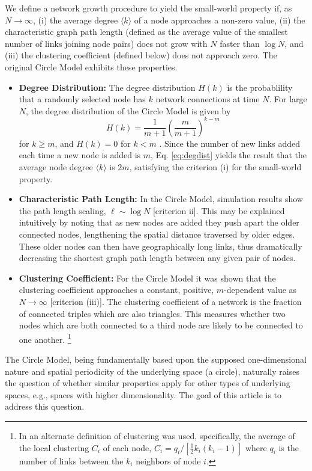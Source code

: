 \documentclass[aps,pre,manuscript,superscriptaddress,amsmath,amssymb,nofootinbib]{revtex4-1}
\begin{document}
We define a network growth procedure to yield the small-world property if, as $N \to \infty$,
(i) the average degree $\langle k \rangle$ of a node approaches a non-zero value,
(ii) the characteristic graph path length (defined as the average value of the smallest number of links joining node pairs) does not grow with $N$ faster than $\log N$, and
(iii) the clustering coefficient (defined below) does not approach zero.
The original Circle Model exhibits these properties.
\begin{itemize}
  \item \textbf{Degree Distribution:} The degree distribution $H(k)$ is the probablility that a randomly selected node has $k$ network connections at time $N$.
For large $N$, the degree distribution of the Circle Model is given by 
\begin{equation}\label{eq:degdist}
H(k) = \frac{1}{m+1}\left(\frac{m}{m+1}\right)^{k-m}
\end{equation}
for $k \geq m$, and $H(k) = 0$ for $k < m$ \cite{ozik2004}.
Since the number of new links added each time a new node is added is $m$, Eq. \eqref{eq:degdist} yields the result that the average node degree $\langle k \rangle$ is $2m$, satisfying the criterion (i) for the small-world property.
  \item \textbf{Characteristic Path Length:} In the Circle Model, simulation results show the path length scaling, $\ell \sim \log N$ [criterion ii].
This may be explained intuitively by noting that as new nodes are added they push apart the older connected nodes, lengthening the spatial distance traversed by older edges. 
These older nodes can then have geographically long links, thus dramatically decreasing the shortest graph path length between any given pair of nodes.
  \item \textbf{Clustering Coefficient:} For the Circle Model it was shown  that the clustering coefficient approaches a constant, positive, $m$-dependent value as $N \to \infty$ [criterion (iii)]. 
The clustering coefficient of a network is the fraction of connected triples which are also triangles.
This measures whether two nodes which are both connected to a third node are likely to be connected to one another. \footnote{In \cite{ozik2004} an alternate definition of clustering was used, specifically, the average of the local clustering $C_i$ of each node, $C_i = q_i/[\frac{1}{2} k_i (k_i-1)]$ where $q_i$ is the number of links between the $k_i$ neighbors of node $i$.}
\end{itemize}
The Circle Model, being fundamentally based upon the supposed one-dimensional nature and spatial periodicity of the underlying space (a circle), naturally raises the question of whether similar properties apply for other types of underlying spaces, e.g., spaces with higher dimensionality. 
The goal of this article is to address this question.
\end{document}
